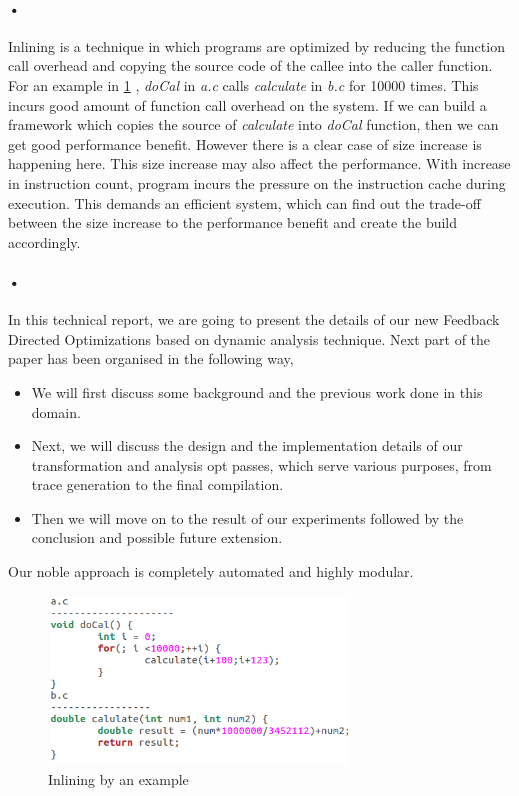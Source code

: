 \documentclass{sigplanconf}
\begin{document}
\paragraph{•} Inlining is a technique in which  programs are optimized by reducing the function call overhead and copying the source code of the callee into the caller function. For an example in \ref{inl_exp} , \emph{doCal} in \emph{a.c} calls \emph{calculate} in \emph{b.c} for 10000 times. This incurs good amount of function call overhead on the system. If we can build a framework which copies the source of  \emph{calculate} into \emph{doCal}  function, then we can get good performance benefit.  However there is a clear case of size increase is happening here.  This size increase may also affect the performance. With increase in instruction count, program incurs the pressure on the instruction cache during execution. This demands an efficient system, which can find out the trade-off between the size increase to the performance benefit and create the build accordingly.
\paragraph*{•} In this technical report, we are going to present the details of our new Feedback Directed Optimizations based on dynamic analysis technique. Next part of the paper has been organised in the following way, 
	\begin{itemize}
		\item We will first discuss some background and the previous work done in this domain.
		\item Next, we will discuss the design and the implementation details of our transformation and analysis opt passes, which serve various purposes, from trace generation to the final compilation.
		\item Then we will move on to the result of our experiments followed by the conclusion and possible future extension.
	\end{itemize}
Our noble approach is completely automated and highly modular.

\begin{figure}
\label{inl_exp}
\begin{center}
	 \includegraphics[width =80mm, height=45mm]{inlining.png} 
\end{center}
\caption{Inlining by an example}
\end{figure}
\end{document}
